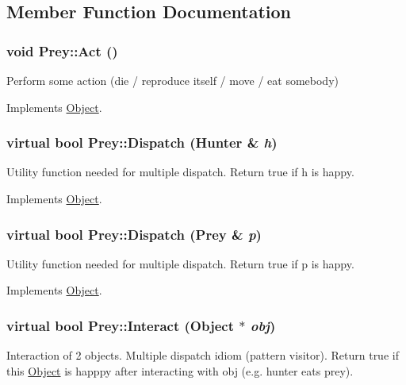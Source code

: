 \subsection{Member Function Documentation}
\hypertarget{classPrey_a940c0a8879376b15dedb7debf9b8f1c8}{
\subsubsection[{Act}]{\setlength{\rightskip}{0pt plus 5cm}void Prey::Act ()}}
\label{classPrey_a940c0a8879376b15dedb7debf9b8f1c8}
Perform some action (die / reproduce itself / move / eat somebody) 

Implements \hyperlink{classObject_a683b351ee47dc69c4117cb9017c467d6}{Object}.

\hypertarget{classPrey_ac6b00aecc20017e58cabef00be961c6f}{
\subsubsection[{Dispatch}]{\setlength{\rightskip}{0pt plus 5cm}virtual bool Prey::Dispatch ({\bf Hunter} \& {\em h})}}
\label{classPrey_ac6b00aecc20017e58cabef00be961c6f}
Utility function needed for multiple dispatch. Return true if h is happy. 

Implements \hyperlink{classObject_a0d0e1f0456837f6736913b1ba374f11d}{Object}.

\hypertarget{classPrey_af37fdbe20f8868903d1ffdf4fb303946}{
\subsubsection[{Dispatch}]{\setlength{\rightskip}{0pt plus 5cm}virtual bool Prey::Dispatch ({\bf Prey} \& {\em p})}}
\label{classPrey_af37fdbe20f8868903d1ffdf4fb303946}
Utility function needed for multiple dispatch. Return true if p is happy. 

Implements \hyperlink{classObject_a70097e3ad4433aec0dd0b938fcedfeca}{Object}.

\hypertarget{classPrey_a3f46445d442e33d47edcc94bf5f537b4}{
\subsubsection[{Interact}]{\setlength{\rightskip}{0pt plus 5cm}virtual bool Prey::Interact ({\bf Object} $\ast$ {\em obj})}}
\label{classPrey_a3f46445d442e33d47edcc94bf5f537b4}
Interaction of 2 objects. Multiple dispatch idiom (pattern visitor). Return true if this \hyperlink{classObject}{Object} is happpy after interacting with obj (e.g. hunter eats prey). 

